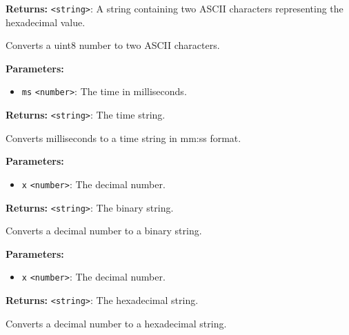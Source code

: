 \documentclass[12pt,a4paper]{article}
\begin{document}
\noindent \textbf{Returns:} \texttt{<string>}: A string containing two ASCII characters representing the hexadecimal value.

\noindent Converts a uint8 number to two ASCII characters.

\vspace{5mm}
\noindent {}


\noindent \textbf{Parameters:}
\begin{itemize}
  \item \texttt{ms} \texttt{<number>}: The time in milliseconds.
\end{itemize}

\noindent \textbf{Returns:} \texttt{<string>}: The time string.

\noindent Converts milliseconds to a time string in mm:ss format.

\vspace{5mm}
\noindent {}


\noindent \textbf{Parameters:}
\begin{itemize}
  \item \texttt{x} \texttt{<number>}: The decimal number.
\end{itemize}

\noindent \textbf{Returns:} \texttt{<string>}: The binary string.

\noindent Converts a decimal number to a binary string.

\vspace{5mm}
\noindent {}


\noindent \textbf{Parameters:}
\begin{itemize}
  \item \texttt{x} \texttt{<number>}: The decimal number.
\end{itemize}

\noindent \textbf{Returns:} \texttt{<string>}: The hexadecimal string.

\noindent Converts a decimal number to a hexadecimal string.

\vspace{5mm}
\noindent {}
\end{document}
